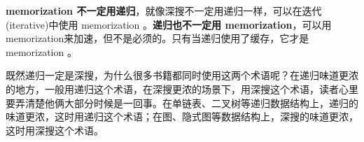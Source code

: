 \textbf{memorization 不一定用递归}，就像深搜不一定用递归一样，可以在迭代(iterative)中使用 memorization 。\textbf{递归也不一定用 memorization}，可以用memorization来加速，但不是必须的。只有当递归使用了缓存，它才是 memorization 。

既然递归一定是深搜，为什么很多书籍都同时使用这两个术语呢？在递归味道更浓的地方，一般用递归这个术语，在深搜更浓的场景下，用深搜这个术语，读者心里要弄清楚他俩大部分时候是一回事。在单链表、二叉树等递归数据结构上，递归的味道更浓，这时用递归这个术语；在图、隐式图等数据结构上，深搜的味道更浓，这时用深搜这个术语。
